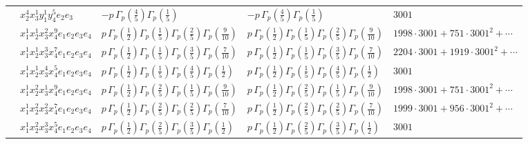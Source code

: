 \documentclass[11pt]{article}
\begin{document}
\begin{table}[ht]
{\begin{tabular}{@{}lllll@{}}
 & $x_{2}^{4} x_{3}^{1} y_{1}^{1} y_{4}^{5} e_{2} e_{3}$ & $- p \, \Gamma_p \left( \frac{4}{5} \right) \Gamma_p \left( \frac{1}{5} \right)$ & $- p \, \Gamma_p \left( \frac{4}{5} \right) \Gamma_p \left( \frac{1}{5} \right)$ & $3001$ \\
 & $x_{1}^{1} x_{2}^{1} x_{3}^{2} x_{4}^{9}  e_{1} e_{2} e_{3} e_{4}$ & $p \, \Gamma_p \left( \frac{1}{2} \right) \Gamma_p \left( \frac{1}{5} \right) \Gamma_p \left( \frac{2}{5} \right) \Gamma_p \left( \frac{9}{10} \right)$ & $p \, \Gamma_p \left( \frac{1}{2} \right) \Gamma_p \left( \frac{1}{5} \right) \Gamma_p \left( \frac{2}{5} \right) \Gamma_p \left( \frac{9}{10} \right)$ & $1998{\cdot}3001{+}751{\cdot}3001^{2}{+}\cdots$ \\
 & $x_{1}^{1} x_{2}^{1} x_{3}^{3} x_{4}^{7}  e_{1} e_{2} e_{3} e_{4}$ & $p \, \Gamma_p \left( \frac{1}{2} \right) \Gamma_p \left( \frac{1}{5} \right) \Gamma_p \left( \frac{3}{5} \right) \Gamma_p \left( \frac{7}{10} \right)$ & $p \, \Gamma_p \left( \frac{1}{2} \right) \Gamma_p \left( \frac{1}{5} \right) \Gamma_p \left( \frac{3}{5} \right) \Gamma_p \left( \frac{7}{10} \right)$ & $2204{\cdot}3001{+}1919{\cdot}3001^{2}{+}\cdots$ \\
 & $x_{1}^{1} x_{2}^{1} x_{3}^{4} x_{4}^{5}  e_{1} e_{2} e_{3} e_{4}$ & $p \, \Gamma_p \left( \frac{1}{2} \right) \Gamma_p \left( \frac{1}{5} \right) \Gamma_p \left( \frac{4}{5} \right) \Gamma_p \left( \frac{1}{2} \right)$ & $p \, \Gamma_p \left( \frac{1}{2} \right) \Gamma_p \left( \frac{1}{5} \right) \Gamma_p \left( \frac{4}{5} \right) \Gamma_p \left( \frac{1}{2} \right)$ & $3001$ \\
 & $x_{1}^{1} x_{2}^{2} x_{3}^{1} x_{4}^{9}  e_{1} e_{2} e_{3} e_{4}$ & $p \, \Gamma_p \left( \frac{1}{2} \right) \Gamma_p \left( \frac{2}{5} \right) \Gamma_p \left( \frac{1}{5} \right) \Gamma_p \left( \frac{9}{10} \right)$ & $p \, \Gamma_p \left( \frac{1}{2} \right) \Gamma_p \left( \frac{2}{5} \right) \Gamma_p \left( \frac{1}{5} \right) \Gamma_p \left( \frac{9}{10} \right)$ & $1998{\cdot}3001{+}751{\cdot}3001^{2}{+}\cdots$ \\
 & $x_{1}^{1} x_{2}^{2} x_{3}^{2} x_{4}^{7}  e_{1} e_{2} e_{3} e_{4}$ & $p \, \Gamma_p \left( \frac{1}{2} \right) \Gamma_p \left( \frac{2}{5} \right) \Gamma_p \left( \frac{2}{5} \right) \Gamma_p \left( \frac{7}{10} \right)$ & $p \, \Gamma_p \left( \frac{1}{2} \right) \Gamma_p \left( \frac{2}{5} \right) \Gamma_p \left( \frac{2}{5} \right) \Gamma_p \left( \frac{7}{10} \right)$ & $1999{\cdot}3001{+}956{\cdot}3001^{2}{+}\cdots$ \\
 & $x_{1}^{1} x_{2}^{2} x_{3}^{3} x_{4}^{5}  e_{1} e_{2} e_{3} e_{4}$ & $p \, \Gamma_p \left( \frac{1}{2} \right) \Gamma_p \left( \frac{2}{5} \right) \Gamma_p \left( \frac{3}{5} \right) \Gamma_p \left( \frac{1}{2} \right)$ & $p \, \Gamma_p \left( \frac{1}{2} \right) \Gamma_p \left( \frac{2}{5} \right) \Gamma_p \left( \frac{3}{5} \right) \Gamma_p \left( \frac{1}{2} \right)$ & $3001$ \\

\end{tabular}}
\end{table}
\end{document}
